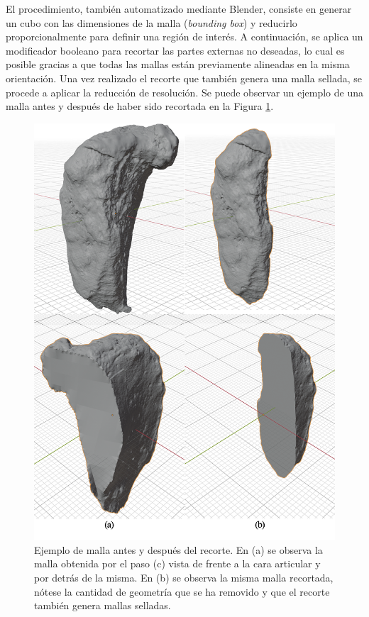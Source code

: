 El procedimiento, también automatizado mediante Blender, consiste en generar un cubo con las dimensiones de la malla (\textit{bounding box}) y reducirlo proporcionalmente para definir una región de interés. A continuación, se aplica un modificador booleano para recortar las partes externas no deseadas, lo cual es posible gracias a que todas las mallas están previamente alineadas en la misma orientación. Una vez realizado el recorte que también genera una malla sellada, se procede a aplicar la reducción de resolución. Se puede observar un ejemplo de una malla antes y después de haber sido recortada en la Figura \ref{bbox_cut_sample}.

\begin{figure}[htbp]
    \includegraphics[width=\linewidth]{figures/4_materials-methods/bbox_cut_sample.png}
    \caption[Ejemplo de malla antes y después del recorte]{Ejemplo de malla antes y después del recorte. En (a) se observa la malla obtenida por el paso (c) vista de frente a la cara articular y por detrás de la misma. En (b) se observa la misma malla recortada, nótese la cantidad de geometría que se ha removido y que el recorte también genera mallas selladas.}
    \label{bbox_cut_sample}
\end{figure}

